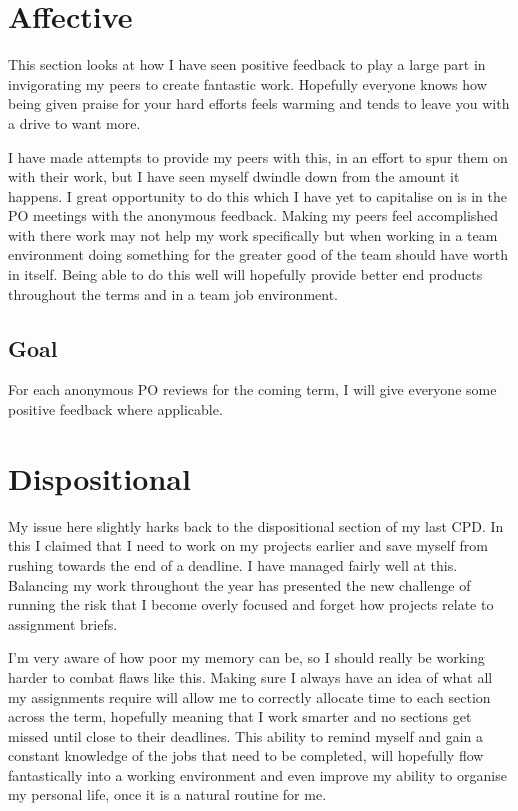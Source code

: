\documentclass{scrartcl}
\begin{document}
\section{Affective}
This section looks at how I have seen positive feedback to play a large part in invigorating my peers to create fantastic work. Hopefully everyone knows how being given praise for your hard efforts feels warming and tends to leave you with a drive to want more.

I have made attempts to provide my peers with this, in an effort to spur them on with their work, but I have seen myself dwindle down from the amount it happens. I great opportunity to do this which I have yet to capitalise on is in the PO meetings with the anonymous feedback. Making my peers feel accomplished with there work may not help my work specifically but when working in a team environment doing something for the greater good of the team should have worth in itself. Being able to do this well will hopefully provide better end products throughout the terms and in a team job environment.
\subsection{Goal}
For each anonymous PO reviews for the coming term, I will give everyone some positive feedback where applicable.

\section{Dispositional}
My issue here slightly harks back to the dispositional section of my last CPD.  In this I claimed that I need to work on my projects earlier and save myself from rushing towards the end of a deadline. I have managed fairly well at this. Balancing my work throughout the year has presented the new challenge of running the risk that I become overly focused and forget how projects relate to assignment briefs.

I'm very aware of how poor my memory can be, so I should really be working harder to combat flaws like this. Making sure I always have an idea of what all my assignments require will allow me to correctly allocate time to each section across the term, hopefully meaning that I work smarter and no sections get missed until close to their deadlines. This ability to remind myself and gain a constant knowledge of the jobs that need to be completed, will hopefully flow fantastically into a working environment and even improve my ability to organise my personal life, once it is a natural routine for me.
\end{document}

